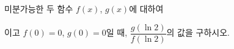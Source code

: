 미분가능한 두 함수 $f(x)$, $g(x)$에 대하여 \par\smallskip{}\par\smallskip\noindent 이고 $f(0)=0$, $g(0)=0$일 때, $\dfrac{g(\ln 2)}{f(\ln 2)}$의 값을 구하시오.
